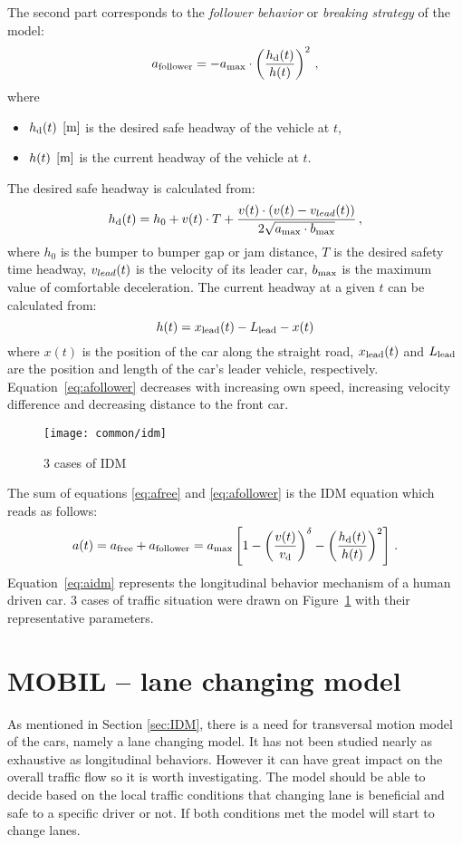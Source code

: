 		The second part corresponds to the \textit{follower behavior} or \textit{breaking strategy} of the model:
		\begin{equation}
			a_{\rm follower}=-a_{\rm max}\cdot \left ( \frac{h_{\rm d}(t)}{h(t)} \right )^2\,,
			\label{eq:afollower}
		\end{equation}
		where
		\begin{itemize}
			\item $h_{\rm d}(t)$ $\rm [m]$ is the desired safe headway of the vehicle at $t$,
			\item $h(t)$ $\rm [m]$ is the current headway of the vehicle at $t$.
		\end{itemize}
		The desired safe headway is calculated from:
		\begin{equation}
			h_{\rm d}(t)=h_0 + v(t)\cdot T + \frac{v(t)\cdot(v(t)-v_{lead}(t))}{2\sqrt{a_{\rm max}\cdot b_{\rm max}}}\,,
		\end{equation}
		where $h_0$ is the bumper to bumper gap or jam distance, $T$ is the desired safety time headway, $v_{lead}(t)$ is the velocity of its leader car, $b_{\rm max}$ is the maximum value of comfortable deceleration.
		The current headway at a given $t$ can be calculated from:
		\begin{equation}
		h(t)=x_{\rm lead}(t)-L_{\rm lead}- x(t)
		\end{equation}
		where $x(t)$ is the position of the car along the straight road, $x_{\rm lead}(t)$ and $L_{\rm lead}$ are the position and length of the car's leader vehicle, respectively.
		Equation~\eqref{eq:afollower} decreases with increasing own speed, increasing velocity difference and decreasing distance to the front car.
		\begin{figure}
			\centering
			\texttt{[image: common/idm]}
			\caption{3 cases of IDM}
			\label{fig:idm}
		\end{figure}
		The sum of equations \eqref{eq:afree} and \eqref{eq:afollower} is the IDM equation which reads as follows:
		\begin{equation}
			a(t)=a_{\rm free}+a_{\rm follower}=a_{\rm max}\left [ 1 - \left ( \frac{v(t)}{{v_{\rm d}}} \right )^{\delta} - \left ( \frac{h_{\rm d}(t)}{h(t)} \right )^2 \right ]\,.
			\label{eq:aidm}
		\end{equation}
		Equation~\eqref{eq:aidm} represents the longitudinal behavior mechanism of a human driven car. 3 cases of traffic situation were drawn on Figure~\ref{fig:idm} with their representative parameters.
	\section{MOBIL -- lane changing model} \label{sec:MOBIL}
		As mentioned in Section \ref{sec:IDM}, there is a need for transversal motion model of the cars, namely a lane changing model. It has not been studied nearly as exhaustive as longitudinal behaviors. However it can have great impact on the overall traffic flow so it is worth investigating. The model should be able to decide based on the local traffic conditions that changing lane is beneficial and safe to a specific driver or not. If both conditions met the model will start to change lanes.


